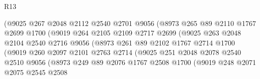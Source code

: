 \begin{lexlean}{R13}
\begin{coremodule}
                            (@9025
                              @267
                              @2048
                              @2112
                              @2540
                              @2701
                              @9056
                              (@8973
                                @265
                                @89
                                @2110
                                @1767
                                @2699
                                @1700
                                (@9019
                                  @264
                                  @2105
                                  @2109
                                  @2717
                                  @2699
                                  (@9025
                                    @263
                                    @2048
                                    @2104
                                    @2540
                                    @2716
                                    @9056
                                    (@8973
                                      @261
                                      @89
                                      @2102
                                      @1767
                                      @2714
                                      @1700
                                      (@9019
                                        @260
                                        @2097
                                        @2101
                                        @2763
                                        @2714
                                        (@9025
                                          @251
                                          @2048
                                          @2078
                                          @2540
                                          @2510
                                          @9056
                                          (@8973
                                            @249
                                            @89
                                            @2076
                                            @1767
                                            @2508
                                            @1700
                                            (@9019
                                              @248
                                              @2071
                                              @2075
                                              @2545
                                              @2508

\end{coremodule}
\end{lexlean}
